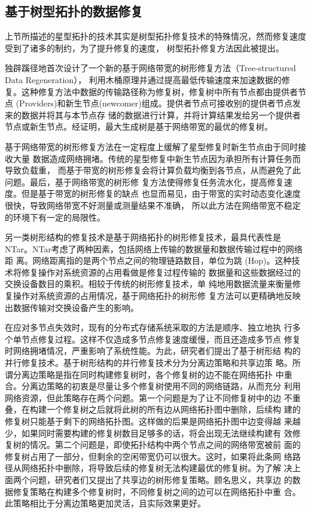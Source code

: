 \subsection{基于树型拓扑的数据修复}
上节所描述的星型拓扑的技术其实是树型拓扑修复技术的特殊情况，然而修复速度受到了诸多的制约，为了提升修复的速度，
树型拓扑修复方法因此被提出。

\citet{li2009tree,li2010tree}独辟蹊径地首次设计了一个新的基于网络带宽的树形修复方法（Tree-structured Data Regeneration），
利用木桶原理并通过提高最低传输速度来加速数据的修复。这种修复方法中数据的传输路径称为修复树，修复树中所有节点都由提供者节点
(Providers)和新生节点(newcomer)组成。提供者节点可接收别的提供者节点发来的数据并将其与本节点存
储的数据进行计算，并将计算结果发给另一个提供者节点或新生节点。经证明，最大生成树是基于网络带宽的最优的修复树。

基于网络带宽的树形修复方法在一定程度上缓解了星型修复时新生节点由于同时接收大量
数据造成网络拥堵。传统的星型修复中新生节点因为承担所有计算任务而导致负载重，
而基于带宽的树形修复会将计算负载均衡到各节点，从而避免了此问题。最后，基于网络带宽的树形修
复方法使得修复任务流水化，提高修复速度。但是基于带宽的树形修复的缺点
也显而易见，由于带宽的实时动态变化速度很快，导致网络带宽不好测量或测量结果不准确，
所以此方法在网络带宽不稳定的环境下有一定的局限性。

另一类树形结构的修复技术是基于网络拓扑的树形修复技术，最具代表性是
NTar\cite{许方亮2013ntar}。NTar考虑了两种因素，包括网络上传输的数据量和数据传输过程中的网络距
离。网络距离指的是两个节点之间的物理链路数目，单位为跳
(Hop)。这种技术将修复操作对系统资源的占用看做是修复过程传输的
数据量和这些数据经过的交换设备数目的乘积。相较于传统的树形修复技术，单
纯地用数据流量来衡量修复操作对系统资源的占用情况，基于网络拓扑的树形修
复方法可以更精确地反映出数据传输对交换设备产生的影响。

在应对多节点失效时，现有的分布式存储系统采取的方法是顺序、独立地执
行多个单节点修复过程。这样不仅造成多节点修复速度缓慢，而且还造成多节点
修复时网络拥堵情况，严重影响了系统性能。为此，研究者们提出了基于树形结
构的并行修复技术\cite{weidong2013tree}。基于树形结构的并行修复技术分为分离边策略和共享边策
略。所谓分离边策略是指在同时构建修复树时，各个修复树的边不能在网络拓扑
中重合。分离边策略的初衷是尽量让多个修复树使用不同的网络链路，从而充分
利用网络资源，但此策略存在两个问题。第一个问题是为了让不同修复树中的边
不重叠，在构建一个修复树之后就将此树的所有边从网络拓扑图中删除，后续构
建的修复树只能基于剩下的网络拓扑图。这样做的后果是网络拓扑图中边变得越
来越少，如果同时需要构建的修复树数目足够多的话，将会出现无法继续构建有
效修复树的情况。第二个问题是，即使拓扑结构中两个节点之间的网络带宽被前
面的修复树占用了一部分，但剩余的空闲带宽仍可以很大。这时，如果将此条网
络路径从网络拓扑中删除，将导致后续的修复树无法构建最优的修复树。为了解
决上面两个问题，研究者们又提出了共享边的树形修复策略。顾名思义，共享边
的数据修复策略在构建多个修复树时，不同修复树之间的边可以在网络拓扑中重
合。此策略相比于分离边策略更加灵活，且实际效果更好。


